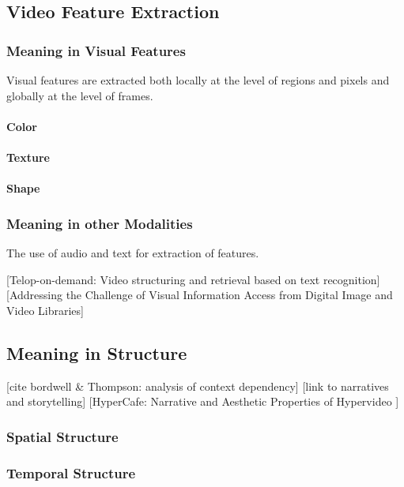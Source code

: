 \subsection{Video Feature Extraction}

\subsubsection{Meaning in Visual Features}

Visual features are extracted both locally at the level of regions and pixels and globally at the level of frames.

\paragraph{Color}

\paragraph{Texture}

\paragraph{Shape}

\subsubsection{Meaning in other Modalities}
The use of audio and text for extraction of features.

[Telop-on-demand: Video structuring and retrieval based on text recognition]\cite{Kuwano:2000wy}
[Addressing the Challenge of Visual Information Access from Digital Image and Video Libraries]\cite{Christel:2005td}

\subsection{Meaning in Structure}


[cite bordwell \& Thompson: analysis of context dependency]
[link to narratives and storytelling]
[HyperCafe: Narrative and Aesthetic Properties of Hypervideo \cite{Sawhney:1996tk}]

\subsubsection{Spatial Structure}
\subsubsection{Temporal Structure}




